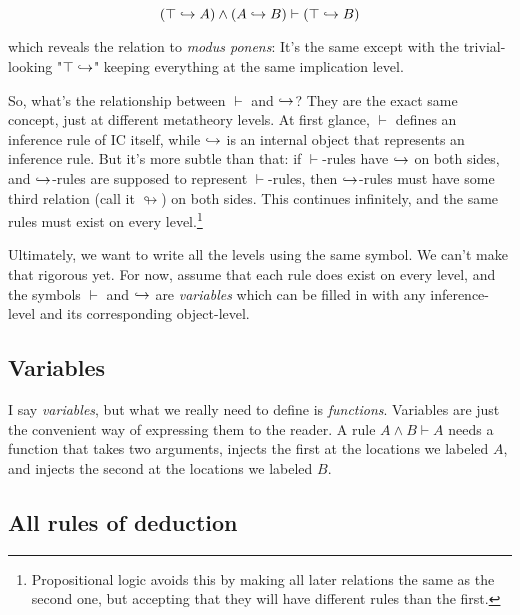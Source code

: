 \documentclass{article}
\begin{document}
  \begin{equation*}
    (\top \hookrightarrow A) \wedge (A \hookrightarrow B) \vdash (\top \hookrightarrow B)\\
  \end{equation*}
  
  which reveals the relation to \emph{modus ponens}: It's the same except with the trivial-looking "$\top \hookrightarrow$" keeping everything at the same implication level.
  
  So, what's the relationship between $\vdash$ and $\hookrightarrow$? They are the exact same concept, just at different metatheory levels. At first glance, $\vdash$ defines an inference rule of IC itself, while $\hookrightarrow$ is an internal object that represents an inference rule. But it's more subtle than that: if $\vdash$-rules have $\hookrightarrow$ on both sides, and $\hookrightarrow$-rules are supposed to represent $\vdash$-rules, then $\hookrightarrow$-rules must have some third relation (call it $\looparrowright$) on both sides. This continues infinitely, and the same rules must exist on every level.\footnote{Propositional logic avoids this by making all later relations the same as the second one, but accepting that they will have different rules than the first.}
  
  Ultimately, we want to write all the levels using the same symbol. We can't make that rigorous yet. For now, assume that each rule does exist on every level, and the symbols $\vdash$ and $\hookrightarrow$ are \emph{variables} which can be filled in with any inference-level and its corresponding object-level.
  
  \subsection{Variables}
  
  I say \emph{variables}, but what we really need to define is \emph{functions}. Variables are just the convenient way of expressing them to the reader. A rule $A \wedge B \vdash A$ needs a function that takes two arguments, injects the first at the locations we labeled $A$, and injects the second at the locations we labeled $B$.
  
  
  \subsection{All rules of deduction}
\end{document}

